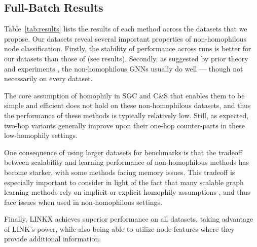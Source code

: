 \documentclass{article}
\begin{document}
\subsection{Full-Batch Results}



Table~\ref{tab:results} lists the results of each method across the datasets that we propose.
Our datasets reveal several important properties of non-homophilous node classification.  Firstly, the stability of performance across runs is better for our datasets than those of \citet{pei2019geom} (see \cite{zhu2020beyond} results). Secondly, as suggested by prior theory and experiments \cite{zhu2020beyond, abu2019mixhop, chien2021adaptive}, the non-homophilous GNNs usually do well --- though not necessarily on every dataset.

The core assumption of homophily in SGC and C\&S that enables them to be simple and efficient does not hold on these non-homophilous datasets, and thus the performance of these methods is typically relatively low. Still, as expected, two-hop variants generally improve upon their one-hop counter-parts in these low-homophily settings. 

One consequence of using larger datasets for benchmarks is that the tradeoff between scalability and learning performance of non-homophilous methods has become starker, with some methods facing memory issues. This tradeoff is especially important to consider in light of the fact that many scalable graph learning methods rely on implicit or explicit homophily assumptions \cite{wu2019simplifying, huang2021combining, deng2020graphzoom, bojchevski2020scaling}, and thus face issues when used in non-homophilous settings.

Finally, LINKX achieves superior performance on all datasets, taking advantage of LINK's power, while also being able to utilize node features where they provide additional information.
\end{document}

